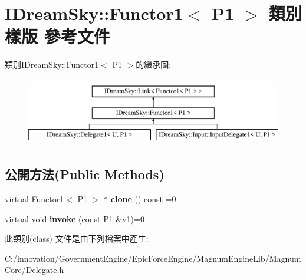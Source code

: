 \hypertarget{class_i_dream_sky_1_1_functor1}{}\section{I\+Dream\+Sky\+:\+:Functor1$<$ P1 $>$ 類別 樣版 參考文件}
\label{class_i_dream_sky_1_1_functor1}
類別\+I\+Dream\+Sky\+:\+:Functor1$<$ P1 $>$的繼承圖\+:\begin{figure}[H]
\begin{center}
\leavevmode
\includegraphics[height=3.000000cm]{class_i_dream_sky_1_1_functor1}
\end{center}
\end{figure}
\subsection*{公開方法(Public Methods)}
\begin{DoxyCompactItemize}
\item 
virtual \hyperlink{class_i_dream_sky_1_1_functor1}{Functor1}$<$ P1 $>$ $\ast$ {\bfseries clone} () const  =0\hypertarget{class_i_dream_sky_1_1_functor1_a0e0ef1712a0d09a3621968bb7939a68c}{}\label{class_i_dream_sky_1_1_functor1_a0e0ef1712a0d09a3621968bb7939a68c}

\item 
virtual void {\bfseries invoke} (const P1 \&v1)=0\hypertarget{class_i_dream_sky_1_1_functor1_ae2a0e8b1d91fc66ffed4a0f1d9d4bcda}{}\label{class_i_dream_sky_1_1_functor1_ae2a0e8b1d91fc66ffed4a0f1d9d4bcda}

\end{DoxyCompactItemize}


此類別(class) 文件是由下列檔案中產生\+:\begin{DoxyCompactItemize}
\item 
C\+:/innovation/\+Government\+Engine/\+Epic\+Force\+Engine/\+Magnum\+Engine\+Lib/\+Magnum\+Core/Delegate.\+h\end{DoxyCompactItemize}
